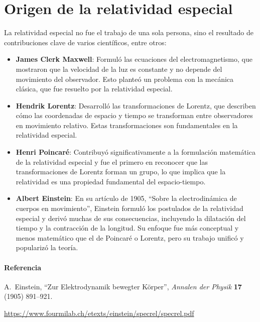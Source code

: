 \documentclass{article}
\begin{document}
\section{Origen de la relatividad especial}
La relatividad especial no fue el trabajo de una sola persona, sino el resultado de contribuciones clave de varios científicos, entre otros:
\begin{itemize}
    \item \textbf{James Clerk Maxwell}: Formuló las ecuaciones del electromagnetismo, que mostraron que la velocidad de la luz es constante y no depende del movimiento del observador. Esto planteó un problema con la mecánica clásica, que fue resuelto por la relatividad especial.
    \item \textbf{Hendrik Lorentz}: Desarrolló las transformaciones de Lorentz, que describen cómo las coordenadas de espacio y tiempo se transforman entre observadores en movimiento relativo. Estas transformaciones son fundamentales en la relatividad especial.
    \item \textbf{Henri Poincaré}: Contribuyó significativamente a la formulación mate\-mática de la relatividad especial y fue el primero en reconocer que las transformaciones de Lorentz forman un grupo, lo que implica que la relatividad es una propiedad fundamental del espacio-tiempo.
    \item \textbf{Albert Einstein}: En su artículo de 1905, ``Sobre la electrodinámica de cuerpos en movimiento'', Einstein formuló los postulados de la relatividad especial y derivó muchas de sus consecuencias, incluyendo la dilatación del tiempo y la contracción de la longitud. Su enfoque fue más conceptual y menos matemático que el de Poincaré o Lorentz, pero su trabajo unificó y popularizó la teoría.
\end{itemize}

\paragraph{Referencia}
A.~Einstein, ``Zur Elektrodynamik bewegter K\"orper'', \textit{Annalen der Physik} \textbf{17} (1905) 891--921.

\noindent
\url{https://www.fourmilab.ch/etexts/einstein/specrel/specrel.pdf}
\end{document}
